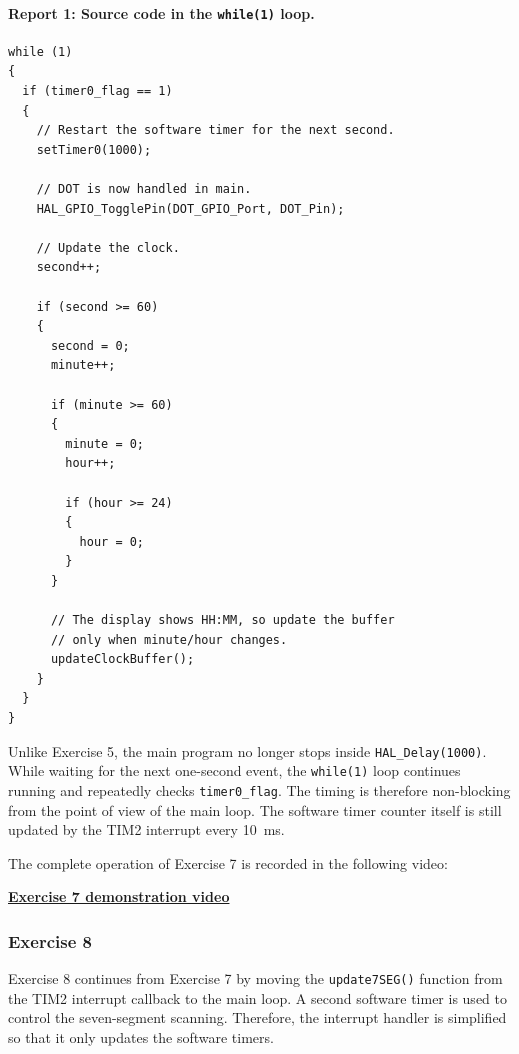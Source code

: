 \paragraph{Report 1: Source code in the \texttt{while(1)} loop.}

\begin{lstlisting}[caption={Digital clock update using the software timer}]
while (1)
{
  if (timer0_flag == 1)
  {
    // Restart the software timer for the next second.
    setTimer0(1000);

    // DOT is now handled in main.
    HAL_GPIO_TogglePin(DOT_GPIO_Port, DOT_Pin);

    // Update the clock.
    second++;

    if (second >= 60)
    {
      second = 0;
      minute++;

      if (minute >= 60)
      {
        minute = 0;
        hour++;

        if (hour >= 24)
        {
          hour = 0;
        }
      }

      // The display shows HH:MM, so update the buffer
      // only when minute/hour changes.
      updateClockBuffer();
    }
  }
}
\end{lstlisting}

Unlike Exercise 5, the main program no longer stops inside \texttt{HAL\_Delay(1000)}. While waiting for the next one-second event, the \texttt{while(1)} loop continues running and repeatedly checks \texttt{timer0\_flag}. The timing is therefore non-blocking from the point of view of the main loop. The software timer counter itself is still updated by the TIM2 interrupt every \SI{10}{ms}.

The complete operation of Exercise 7 is recorded in the following video:
\begin{center}
    \href{https://github.com/quangnguyencomeng/CO3009-261-CC-2453052/blob/main/Lab/lab_reports/source/vids/lab2_ex7.mp4}{\textbf{Exercise 7 demonstration video}}
\end{center}




\subsubsection{Exercise 8}

Exercise 8 continues from Exercise 7 by moving the \texttt{update7SEG()} function from the TIM2 interrupt callback to the main loop. A second software timer is used to control the seven-segment scanning. Therefore, the interrupt handler is simplified so that it only updates the software timers.

